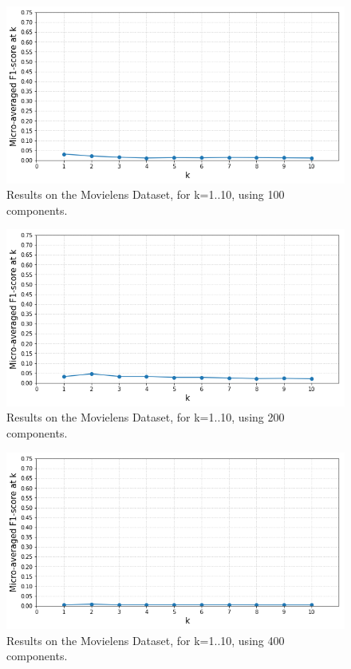 \begin{figure}[!h]
    \centering
    \includegraphics[width=\textwidth]{chapters/05_experiments/images/topic-words-100d-movielens.png}
    \caption{Results on the Movielens Dataset, for k=1..10, using 100 components.}
    \label{fig:ovr_svm_movielens}
\end{figure}

\begin{figure}[!h]
    \centering
    \includegraphics[width=\textwidth]{chapters/05_experiments/images/topic-words-200d-movielens.png}
    \caption{Results on the Movielens Dataset, for k=1..10, using 200 components.}
    \label{fig:ovr_svm_movielens}
\end{figure}

\begin{figure}[!h]
    \centering
    \includegraphics[width=\textwidth]{chapters/05_experiments/images/topic-words-400d-movielens.png}
    \caption{Results on the Movielens Dataset, for k=1..10, using 400 components.}
    \label{fig:ovr_svm_movielens}
\end{figure}

